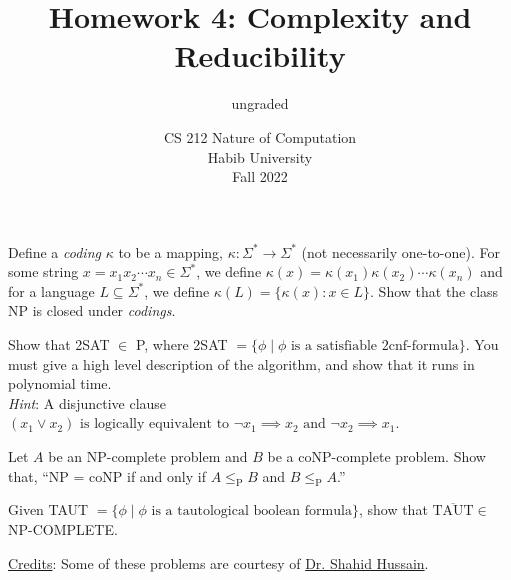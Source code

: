 \documentclass[addpoints]{exam}
\title{Homework 4: Complexity and Reducibility}
\author{ungraded} %
\date{CS 212 Nature of Computation\\Habib University\\Fall 2022}
\begin{document}
\maketitle

\begin{questions}

        \question[10] Define a \textit{coding} $\kappa$ to be a mapping,  $\kappa:\Sigma^*\rightarrow \Sigma^*$ (not necessarily one-to-one). For some string $x = x_1x_2\cdots x_n\in\Sigma^*$, we define $\kappa(x) = \kappa(x_1)\kappa(x_2)\cdots\kappa(x_n)$ and for a language $L\subseteq \Sigma^*$, we define $\kappa(L) = \{\kappa(x): x\in L \}$. Show that the class NP is closed under \textit{codings}. 


\question[10] Show that 2SAT $\in$  P, where 2SAT $ = \{ \phi \mid \phi \text{ is a satisfiable 2cnf-formula}\}$. You must give a high level description of the algorithm, and show that it runs in polynomial time. \\ \textit{Hint}: A disjunctive clause $(x_1 \vee x_2) \text{ is logically equivalent to } \neg x_1 \implies x_2 \text{ and } \neg x_2 \implies x_1$.

\question[10] Let $A$ be an NP-complete problem and $B$ be a coNP-complete problem. Show that, ``NP = coNP if and only if $A \leq_\text{P} B$ and $B \leq_\text{P} A$.''

\question[10] Given TAUT $ = \{ \phi \mid \phi \text{ is a tautological boolean formula} \}$, show that $\overline{\text{TAUT}} \in$ NP-COMPLETE.
  

\end{questions}

\noindent\underline{Credits}: Some of these problems are courtesy of \href{https://www.iba.edu.pk/faculty-profile.php?ftype=&id=shahidhussain}{Dr. Shahid Hussain}.
\end{document}
